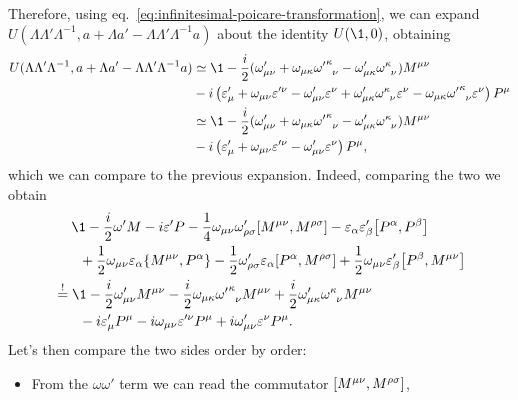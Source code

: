 \begin{mdframed}
\begin{innerproof}
    Therefore, using eq.~\eqref{eq:infinitesimal-poicare-transformation}, we can expand $U(\Lambda\Lambda'\Lambda^{-1},a + \Lambda a' - \Lambda\Lambda'\Lambda^{-1}a)$ about the identity $U(\1,0)$, obtaining
    \begin{align*}
        U(\Lambda\Lambda'\Lambda^{-1},a + \Lambda a' - \Lambda\Lambda'\Lambda^{-1}a) &\simeq \1 - \frac{i}{2} (\omega'_{\mu\nu} + \omega_{\mu\kappa}\tensor{{\omega'}}{^\kappa_\nu}-\omega'_{\mu\kappa} \tensor{\omega}{^\kappa_\nu})M^{\mu\nu} \\
        &- i \left( \epsilon'_\mu +\omega_{\mu\nu} \epsilon'^\nu - \omega'_{\mu\nu} \epsilon^\nu + \omega'_{\mu\kappa}\tensor{\omega}{^\kappa_\nu} \epsilon^\nu - \omega_{\mu\kappa} \tensor{{\omega'}}{^\kappa_\nu} \epsilon^\nu \right) P^\mu \\
        &\simeq \1 - \frac{i}{2} (\omega'_{\mu\nu} + \omega_{\mu\kappa}\tensor{{\omega'}}{^\kappa_\nu}-\omega'_{\mu\kappa} \tensor{\omega}{^\kappa_\nu})M^{\mu\nu} \\
        &- i \left( \epsilon'_\mu +\omega_{\mu\nu} \epsilon'^\nu - \omega'_{\mu\nu} \epsilon^\nu\right) P^\mu ,
    \end{align*}
    which we can compare to the previous expansion. Indeed, comparing the two we obtain
    \begin{align*}
        &\;\quad \1 -\frac{i}{2} \omega' M - i \epsilon' P 
        - \frac{1}{4} \omega_{\mu\nu} \omega'_{\rho\sigma} \comm{M^{\mu\nu}}{M^{\rho\sigma}} 
        - \epsilon_\alpha \epsilon'_\beta \comm{P^\alpha}{P^\beta} \\
        &\;\quad\;\; +\frac{1}{2} \omega_{\mu\nu} \epsilon_\alpha \{ M^{\mu\nu}, P^\alpha \} - \frac{1}{2} \omega'_{\rho\sigma} \epsilon_\alpha \comm{P^\alpha}{M^{\rho\sigma}} + \frac{1}{2} \omega_{\mu\nu} \epsilon'_\beta \comm{P^\beta}{M^{\mu\nu}} \\
        &\overset{!}{=} \1 - \frac{i}{2} \omega'_{\mu\nu} M^{\mu\nu} - \frac{i}{2} \omega_{\mu\kappa}\tensor{{\omega'}}{^\kappa_\nu} M^{\mu\nu} + \frac{i}{2} \omega'_{\mu\kappa} \tensor{\omega}{^\kappa_\nu} M^{\mu\nu} \\
        &\quad\;\;\;  - i \epsilon'_\mu P^\mu - i \omega_{\mu\nu} \epsilon'^\nu P^\mu + i \omega'_{\mu\nu} \epsilon^\nu P^\mu   .
    \end{align*}
    Let's then compare the two sides order by order:
    \begin{itemize}
        \item From the $\omega\omega'$ term we can read the commutator $\comm{M^{\mu\nu}}{M^{\rho\sigma}}$,

\end{itemize}
\end{innerproof}
\end{mdframed}
